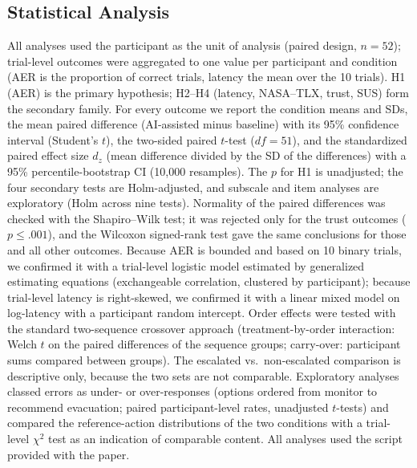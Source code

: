 \documentclass[journal]{IEEEtran}
\theoremstyle{plain}
\theoremstyle{definition}
\begin{document}
    \subsection{Statistical Analysis}
    All analyses used the participant as the unit of analysis (paired design, $n=52$); trial-level outcomes were aggregated to one value per participant and condition (AER is the proportion of correct trials, latency the mean over the 10 trials). H1 (AER) is the primary hypothesis; H2--H4 (latency, NASA--TLX, trust, SUS) form the secondary family. For every outcome we report the condition means and SDs, the mean paired difference (AI-assisted minus baseline) with its 95\% confidence interval (Student's $t$), the two-sided paired $t$-test ($df=51$), and the standardized paired effect size $d_z$ \cite{Lakens2013} (mean difference divided by the SD of the differences) with a 95\% percentile-bootstrap CI (10{,}000 resamples). The $p$ for H1 is unadjusted; the four secondary tests are Holm-adjusted, and subscale and item analyses are exploratory (Holm across nine tests). Normality of the paired differences was checked with the Shapiro--Wilk test; it was rejected only for the trust outcomes ($p \leq .001$), and the Wilcoxon signed-rank test gave the same conclusions for those and all other outcomes. Because AER is bounded and based on 10 binary trials, we confirmed it with a trial-level logistic model estimated by generalized estimating equations (exchangeable correlation, clustered by participant); because trial-level latency is right-skewed, we confirmed it with a linear mixed model on log-latency with a participant random intercept. Order effects were tested with the standard two-sequence crossover approach (treatment-by-order interaction: Welch $t$ on the paired differences of the sequence groups; carry-over: participant sums compared between groups). The escalated vs.\ non-escalated comparison is descriptive only, because the two sets are not comparable. Exploratory analyses classed errors as under- or over-responses (options ordered from monitor to recommend evacuation; paired participant-level rates, unadjusted $t$-tests) and compared the reference-action distributions of the two conditions with a trial-level $\chi^2$ test as an indication of comparable content. All analyses used the script provided with the paper.
\end{document}
